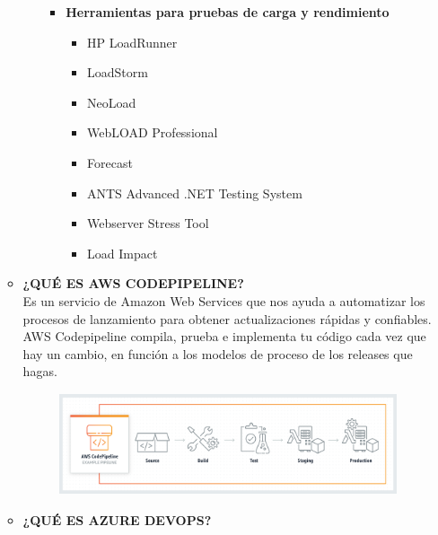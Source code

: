 \documentclass[12pt,a4paper,oneside]{book}
\begin{document}
\begin{enumerate}
\begin{itemize}
\begin{enumerate}
\begin{itemize}
\begin{itemize}
									\end{itemize}
								\item \textbf{Herramientas para pruebas de carga y rendimiento} 
									\begin{itemize}
										\item HP LoadRunner
										\item LoadStorm
										\item NeoLoad
										\item WebLOAD Professional
										\item Forecast
										\item ANTS Advanced .NET Testing System
										\item Webserver Stress Tool
										\item Load Impact
										
									\end{itemize}
							\end{itemize}
						
					\end{enumerate}
					
				\item \textbf{¿QUÉ ES AWS CODEPIPELINE?}\\
				
					Es un servicio de Amazon Web Services que nos ayuda a automatizar los procesos de lanzamiento para obtener actualizaciones rápidas y confiables. AWS Codepipeline compila, prueba e implementa tu código cada vez que hay un cambio, en función a los modelos de proceso de los releases que hagas.\\
					
			\newpage			
						\begin{center}
							\begin{figure}[htb]
								\centering \includegraphics[width=10cm, height=3cm]{img/code.png}
							\end{figure}
						\end{center}
						
					
				\item \textbf{¿QUÉ ES AZURE DEVOPS?}\\
				

\end{itemize}
\end{enumerate}
\end{document}
